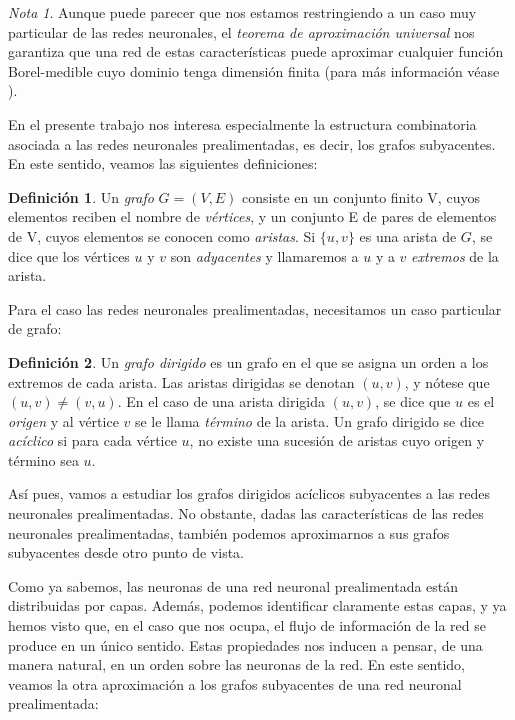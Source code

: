 \documentclass[12pt, a4paper, twoside]{book}
\numberwithin{equation}{section}
\theoremstyle{definition}
\newtheorem{defi}{Definición}[section]
\theoremstyle{remark}
\newtheorem*{remark}{Nota}
\theoremstyle{plain}
\begin{document}
	\begin{remark}
	Aunque puede parecer que nos 
	estamos restringiendo a un caso muy particular de las redes 
	neuronales, el \emph{teorema de aproximación universal} nos garantiza
	que una red de estas características puede aproximar cualquier función
	Borel-medible cuyo dominio tenga dimensión finita (para más 
	información véase \cite{TeoremaAproxUn-Kurt}).
	\end{remark}

	En el presente trabajo nos interesa especialmente la estructura 
	combinatoria asociada a las redes neuronales prealimentadas, es decir, 
	los grafos subyacentes. En este sentido, veamos las siguientes 
	definiciones:

	\begin{defi}
		Un \textit{grafo} $G=(V,E)$ consiste en un conjunto finito V, 
		cuyos 
		elementos reciben el nombre de \textit{vértices}, y un 
		conjunto 
		E de pares de elementos de V, cuyos elementos se conocen como 
		\textit{aristas}. Si $\{u,v\}$ es una arista de $G$, se dice 
		que los vértices $u$ y $v$ son \textit{adyacentes} y 
		llamaremos a $u$ y a $v$ \textit{extremos} de la arista.
	\end{defi}

	Para el caso las redes neuronales prealimentadas, necesitamos un caso 
	particular de grafo:
	
	\begin{defi}
		Un \textit{grafo dirigido} es un grafo en el que se asigna un 
		orden a los extremos de cada arista. Las aristas dirigidas se
		denotan $(u,v)$, y nótese que $(u,v)\neq(v,u)$. En el 
		caso de una arista dirigida $(u,v)$, se dice que $u$ es el 
		\textit{origen} y al vértice $v$ se le llama \textit{término} 
		de la arista. Un grafo dirigido se dice \textit{acíclico} si 
		para cada vértice $u$, no existe una sucesión de aristas cuyo
		origen y término sea $u$.
	\end{defi}

	Así pues, vamos a estudiar los grafos dirigidos acíclicos 
	subyacentes a las redes neuronales prealimentadas. No obstante, dadas 
	las características de las redes neuronales prealimentadas, también 
	podemos aproximarnos a sus grafos subyacentes desde otro punto de 
	vista. 

	Como ya sabemos, las neuronas de una red neuronal prealimentada están
	distribuidas por capas. Además, podemos identificar claramente estas 
	capas, y ya hemos visto que, en el caso que nos ocupa, el flujo de 
	información de la red se produce en un único sentido. Estas 
	propiedades nos inducen a pensar, de una manera natural, en un orden 
	sobre las neuronas de la red. 
	En este sentido, veamos la otra aproximación a los grafos subyacentes
	de una red neuronal prealimentada:
\end{document}
